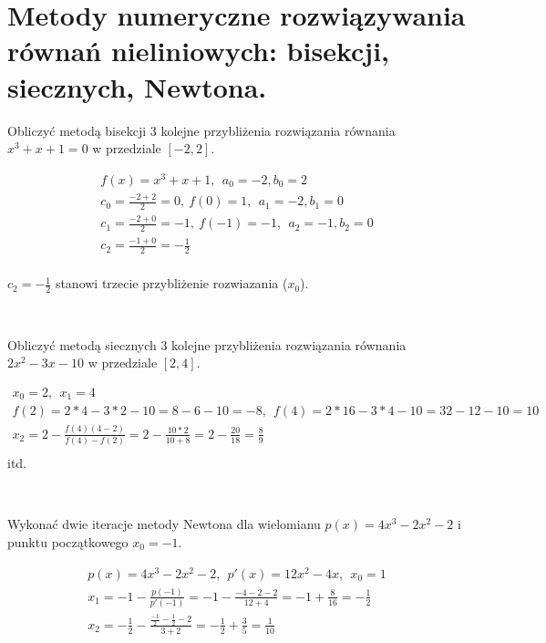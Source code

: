 \documentclass[12pt]{article}
\begin{document}
    \newpage

    \section{Metody numeryczne rozwiązywania równań nieliniowych: bisekcji, siecznych, Newtona.}

    \begin{exercise}
        Obliczyć metodą bisekcji 3 kolejne przybliżenia rozwiązania równania $x^3 + x + 1 = 0$ w przedziale $[-2, 2]$.
    \end{exercise}

    \begin{gather*}
        f(x) = x^3 + x + 1, ~~ a_0 = -2, b_0 = 2\\
        c_0 = \frac{-2+2}{2} = 0, ~ f(0) = 1, ~~ a_1 = -2, b_1 = 0\\
        c_1 = \frac{-2+0}{2} = -1, ~ f(-1) = -1, ~~ a_2 = -1, b_2 = 0\\
        c_2 = \frac{-1+0}{2} = -\frac{1}{2}\\
    \end{gather*}

    $c_2 = -\frac{1}{2}$ stanowi trzecie przybliżenie rozwiazania ($x_0$).

    \hfill \\

    \begin{exercise}
        Obliczyć metodą siecznych 3 kolejne przybliżenia rozwiązania równania $2x^2 - 3x - 10$ w przedziale $[2, 4]$.
    \end{exercise}
    \begin{gather*}
        x_0 = 2, ~~ x_1 = 4\\
        f(2) = 2*4 - 3*2 - 10 = 8 - 6 - 10 = -8, ~~ f(4) = 2*16 - 3*4 - 10 = 32 - 12 - 10 = 10\\
        x_2 = 2 - \frac{f(4)(4-2)}{f(4) - f(2)} = 2 - \frac{10*2}{10 + 8} = 2 - \frac{20}{18} = \frac{8}{9}\\
    \end{gather*}
    itd.

    \hfill \\

    \begin{exercise}
        Wykonać dwie iteracje metody Newtona dla wielomianu $p(x) = 4x^3 - 2x^2 - 2$ i punktu początkowego $x_0 = -1$.
    \end{exercise}

    \begin{gather*}
        p(x) = 4x^3 - 2x^2 - 2, ~~ p'(x) = 12x^2 - 4x, ~~ x_0 = 1\\
        x_1 = -1 - \frac{p(-1)}{p'(-1)} = -1 - \frac{-4-2-2}{12+4} = -1 + \frac{8}{16}  = -\frac{1}{2}\\
        x_2 = -\frac{1}{2} - \frac{\frac{-1}{2} - \frac{1}{2} - 2}{3 + 2} = -\frac{1}{2} + \frac{3}{5} = \frac{1}{10}\\
    \end{gather*}
\end{document}
